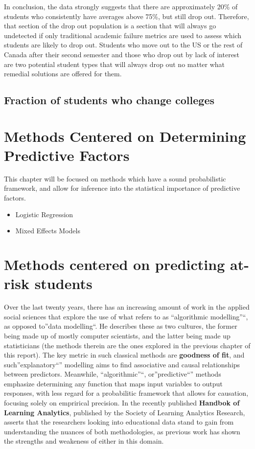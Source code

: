 \documentclass[]{book}
\providecommand{\tightlist}{%
  \setlength{\itemsep}{0pt}\setlength{\parskip}{0pt}}
\theoremstyle{definition}
\theoremstyle{definition}
\theoremstyle{remark}
\begin{document}
In conclusion, the data strongly suggests that there are approximately
20\% of students who consistently have averages above 75\%, but still
drop out. Therefore, that section of the drop out population is a
section that will always go undetected if only traditional academic
failure metrics are used to assess which students are likely to drop
out. Students who move out to the US or the rest of Canada after their
second semester and those who drop out by lack of interest are two
potential student types that will always drop out no matter what
remedial solutions are offered for them.

\section{Fraction of students who change
colleges}\label{fraction-of-students-who-change-colleges}

\chapter{Methods Centered on Determining Predictive
Factors}\label{methods-centered-on-determining-predictive-factors}

This chapter will be focused on methods which have a sound probabilistic
framework, and allow for inference into the statistical importance of
predictive factors.

\begin{itemize}
\tightlist
\item
  Logistic Regression
\item
  Mixed Effects Models
\end{itemize}

\chapter{Methods centered on predicting at-risk
students}\label{methods-centered-on-predicting-at-risk-students}

Over the last twenty years, there has an increasing amount of work in
the applied social sciences that explore the use of what
\citep{breiman2001twocultures} refers to as ``algorithmic modelling''``,
as opposed to''data modelling``. He describes these as two cultures, the
former being made up of mostly computer scientists, and the latter being
made up statisticians (the methods therein are the ones explored in the
previous chapter of this report). The key metric in such classical
methods are \textbf{goodness of fit}, and such''explanatory``''
modelling aims to find associative and causal relationships between
predictors. Meanwhile, ``algorithmic''``, or''predictive``'' methods
emphasize determining any function that maps input variables to output
responses, with less regard for a probabilitic framework that allows for
causation, focusing solely on emprirical
precision\citep{shmueli2010explain}. In the recently published
\textbf{Handbok of Learning Analytics}\citep{hla2017}, published by the
Society of Learning Analytics Research, \citep{bergner_measurement_2017}
asserts that the researchers looking into educational data stand to gain
from understanding the nuances of both methodologies, as previous work
has shown the strengths and weakeness of either in this domain.
\end{document}
